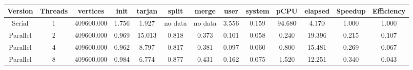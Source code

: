 \begin{tabular}{|c|c|c|c|c|c|c|c|c|c|c|c|c|}
\toprule
 Version &  Threads &   vertices &  init &  tarjan &   split &   merge &  user &  system &   pCPU &  elapsed &  Speedup &  Efficiency \\
\midrule
  Serial &        1 & 409600.000 & 1.756 &   1.927 & no data & no data & 3.556 &   0.159 & 94.680 &    4.170 &    1.000 &       1.000 \\
Parallel &        2 & 409600.000 & 0.969 &  15.013 &   0.818 &   0.373 & 0.101 &   0.058 &  0.240 &   19.396 &    0.215 &       0.107 \\
Parallel &        4 & 409600.000 & 0.962 &   8.797 &   0.817 &   0.381 & 0.097 &   0.060 &  0.800 &   15.481 &    0.269 &       0.067 \\
Parallel &        8 & 409600.000 & 0.984 &   6.774 &   0.877 &   0.431 & 0.162 &   0.075 &  1.520 &   12.251 &    0.340 &       0.043 \\
\bottomrule
\end{tabular}
